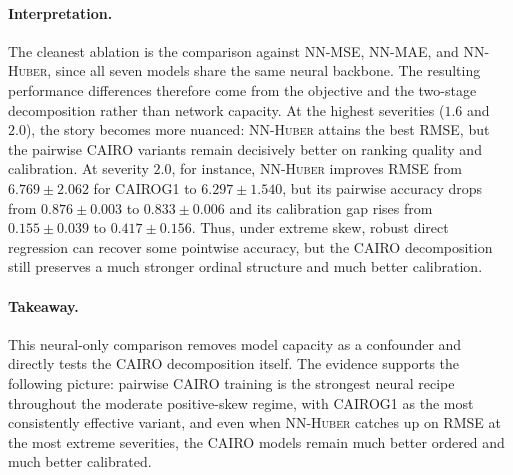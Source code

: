\paragraph{Interpretation.}
The cleanest ablation is the comparison against \textsc{NN-MSE}, \textsc{NN-MAE}, and \textsc{NN-Huber}, since all seven models share the same neural backbone. The resulting performance differences therefore come from the objective and the two-stage decomposition rather than network capacity. At the highest severities ($1.6$ and $2.0$), the story becomes more nuanced: \textsc{NN-Huber} attains the best RMSE, but the pairwise CAIRO variants remain decisively better on ranking quality and calibration. At severity $2.0$, for instance, \textsc{NN-Huber} improves RMSE from $6.769 \pm 2.062$ for \textsc{CAIROG1} to $6.297 \pm 1.540$, but its pairwise accuracy drops from $0.876 \pm 0.003$ to $0.833 \pm 0.006$ and its calibration gap rises from $0.155 \pm 0.039$ to $0.417 \pm 0.156$. Thus, under extreme skew, robust direct regression can recover some pointwise accuracy, but the CAIRO decomposition still preserves a much stronger ordinal structure and much better calibration.

\paragraph{Takeaway.}
This neural-only comparison removes model capacity as a confounder and directly tests the CAIRO decomposition itself. The evidence supports the following picture: pairwise CAIRO training is the strongest neural recipe throughout the moderate positive-skew regime, with \textsc{CAIROG1} as the most consistently effective variant, and even when \textsc{NN-Huber} catches up on RMSE at the most extreme severities, the CAIRO models remain much better ordered and much better calibrated.
